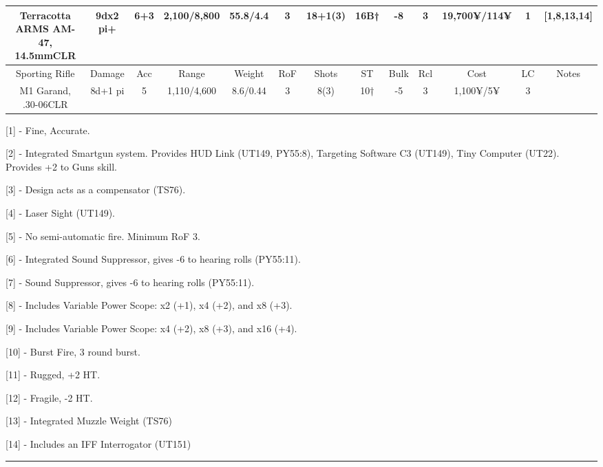 \begin{center}
\begin{adjustwidth}{-10mm}{}
{\begin{tabular}{|c|c|c|c|c|c|c|c|c|c|c|c|c|}
				Terracotta ARMS AM-47, 14.5mmCLR & 9dx2 pi+ & 6+3 & 2,100/8,800 &  55.8/4.4 & 3 & 18+1(3) & 16B† & -8 & 3 &  19,700¥/114¥ & 1 & [1,8,13,14] \\
				\hline
				Sporting Rifle & Damage & Acc & Range & Weight & RoF & Shots & ST & Bulk & Rcl & Cost & LC & Notes\\
				\hline
				M1 Garand, .30-06CLR & 8d+1 pi & 5 & 1,110/4,600 & 8.6/0.44 & 3 & 8(3) & 10† & -5 & 3 & 1,100¥/5¥ & 3 & \\
				\hline
			\end{tabular}
		}
	\end{adjustwidth}
\end{center}

[1] - Fine, Accurate.

[2] - Integrated Smartgun system. Provides HUD Link (UT149, PY55:8), Targeting Software C3 (UT149), Tiny Computer (UT22). Provides +2 to Guns skill.

[3] - Design acts as a compensator (TS76).

[4] - Laser Sight (UT149).

[5] - No semi-automatic fire. Minimum RoF 3.

[6] - Integrated Sound Suppressor, gives -6 to hearing rolls (PY55:11).

[7] - Sound Suppressor, gives -6 to hearing rolls (PY55:11).

[8] - Includes Variable Power Scope: x2 (+1), x4 (+2), and x8 (+3).

[9] - Includes Variable Power Scope: x4 (+2), x8 (+3), and x16 (+4).

[10] - Burst Fire, 3 round burst.

[11] - Rugged, +2 HT.

[12] - Fragile, -2 HT.

[13] - Integrated Muzzle Weight (TS76)

[14] - Includes an IFF Interrogator (UT151)

\par\rule{\textwidth}{0.5pt} 


